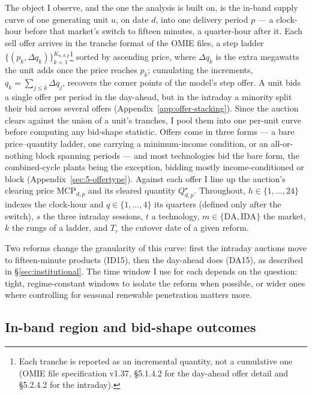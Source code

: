 \documentclass[11pt,a4paper]{article}
\theoremstyle{definition}
\theoremstyle{remark}
\theoremstyle{plain}
\begin{document}
The object I observe, and the one the analysis is built on, is the in-band supply curve of one generating unit $u$, on date $d$, into one delivery period $p$ --- a clock-hour before that market's switch to fifteen minutes, a quarter-hour after it. Each sell offer arrives in the tranche format of the OMIE files, a step ladder $\{(p_k, \Delta q_k)\}_{k=1}^{K_{u,d,p}}$\footnote{Each tranche is reported as an incremental quantity, not a cumulative one (OMIE file specification v1.37, \S5.1.4.2 for the day-ahead offer detail and \S5.2.4.2 for the intraday).}
 sorted by ascending price, where $\Delta q_k$ is the extra megawatts the unit adds once the price reaches $p_k$; cumulating the increments, $q_k = \sum_{j \le k} \Delta q_j$, recovers the corner points of the model's step offer. A unit bids a single offer per period in the day-ahead, but in the intraday a minority split their bid across several offers (Appendix~\ref{app:offer-stacking}). Since the auction clears against the union of a unit's tranches, I pool them into one per-unit curve before computing any bid-shape statistic.
  Offers come in three forms --- a bare price--quantity ladder, one carrying a minimum-income condition, or an all-or-nothing block spanning periods --- and most technologies bid the bare form, the combined-cycle plants being the exception, bidding mostly income-conditioned or block (Appendix~\ref{sec:5-offertype}).
   Against each offer I line up the auction's clearing price $\text{MCP}_{d,p}$ and its cleared quantity $Q^\star_{d,p}$. Throughout, $h \in \{1,\dots,24\}$ indexes the clock-hour and $q \in \{1,\dots,4\}$ its quarters (defined only after the switch), $s$ the three intraday sessions, $t$ a technology, $m \in \{\text{DA},\text{IDA}\}$ the market, $k$ the rungs of a ladder, and $T_r$ the cutover date of a given reform.

Two reforms change the granularity of this curve: first the intraday auctions move to fifteen-minute products (ID15), then the day-ahead does (DA15), as described in \S\ref{sec:institutional}.
 The time window I use for each depends on the question: tight, regime-constant windows to isolate the reform when possible, or wider ones where controlling for seasonal renewable penetration matters more.

\subsection{In-band region and bid-shape outcomes}\label{sec:data:bandwidth}
\end{document}

